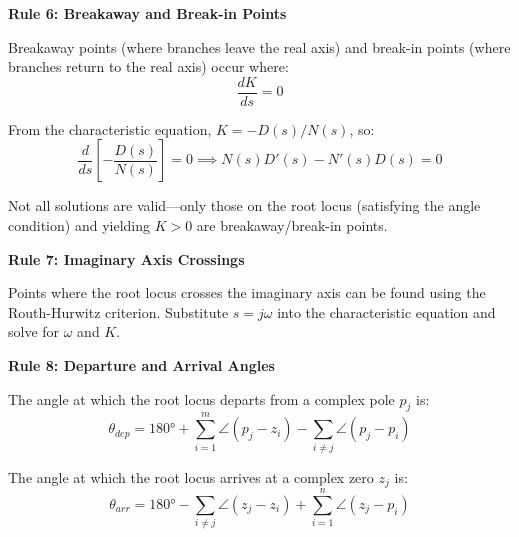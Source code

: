 \textbf{Rule 6: Breakaway and Break-in Points}

Breakaway points (where branches leave the real axis) and break-in points (where branches return to the real axis) occur where:
\begin{equation}
\frac{dK}{ds} = 0
\end{equation}

From the characteristic equation, $K = -D(s)/N(s)$, so:
\begin{equation}
\frac{d}{ds}\left[-\frac{D(s)}{N(s)}\right] = 0 \implies N(s)D'(s) - N'(s)D(s) = 0
\end{equation}

Not all solutions are valid---only those on the root locus (satisfying the angle condition) and yielding $K > 0$ are breakaway/break-in points.

\textbf{Rule 7: Imaginary Axis Crossings}

Points where the root locus crosses the imaginary axis can be found using the Routh-Hurwitz criterion. Substitute $s = j\omega$ into the characteristic equation and solve for $\omega$ and $K$.

\textbf{Rule 8: Departure and Arrival Angles}

The angle at which the root locus departs from a complex pole $p_j$ is:
\begin{equation}
\theta_{dep} = 180° + \sum_{i=1}^{m} \angle(p_j - z_i) - \sum_{i \neq j} \angle(p_j - p_i)
\end{equation}

The angle at which the root locus arrives at a complex zero $z_j$ is:
\begin{equation}
\theta_{arr} = 180° - \sum_{i \neq j} \angle(z_j - z_i) + \sum_{i=1}^{n} \angle(z_j - p_i)
\end{equation}

